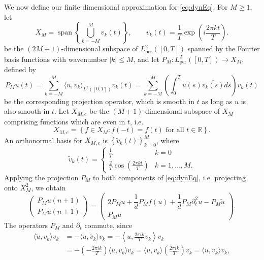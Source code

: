 \documentclass[12pt,reqno]{amsart}
\def\R{{\mathbb R}}
\def\per{\textrm{per}}
\DeclareMathOperator{\spn}{span}
\begin{document}
We now define our finite dimensional approximation for \cref{eq:dynEq}. For $M \geq 1$, let 
\begin{equation}\label{eq:XM}
X_M = \spn\left\{ \bigcup_{k = -M}^M v_k(t) \right\}, \qquad
v_k(t) = \frac{1}{T} \exp\left( i \frac{2 \pi k t}{T} \right).
\end{equation}
be the $(2M+1)$-dimensional subspace of $L_\per^2([0,T])$ spanned by the Fourier basis functions with wavenumber $|k| \leq M$, and let $P_M: L_\per^2([0,T]) \rightarrow X_M$, defined by
\begin{equation}\label{eq:PM}
P_M u(t) = \sum_{k=-M}^M \langle u, v_k \rangle_{L^2([0,T])} v_k(t)
= \sum_{k=-M}^M \left( \int_0^T u(s) \overline{v_k(s)} ds \right) v_k(t)
\end{equation}
be the corresponding projection operator, which is smooth in $t$ as long as $u$ is also smooth in $t$. Let $X_{M,e}$ be the $(M+1)$-dimensional subspace of $X_M$ comprising functions which are even in $t$, i.e.
\begin{equation}
X_{M,e} = \left\{ f \in X_M : f(-t) = f(t) \text{ for all }t \in \R \right\}.
\end{equation}
An orthonormal basis for $X_{M,e}$ is $\left\{ \tilde{v}_k(t) \right\}_{k=0}^M$, where
\begin{equation}\label{eq:vktilde}
\tilde{v}_k(t) = \begin{cases}
\frac{1}{T} & k = 0 \\
\frac{2}{T} \cos\left( \frac{2 \pi k t}{T} \right) & k = 1, \dots, M.
\end{cases}
\end{equation}
Applying the projection $P_M$ to both components of \cref{eq:dynEq}, i.e. projecting onto $X_M^2$, we obtain
\begin{equation}
\begin{pmatrix}P_M u(n+1) \\ P_M \tilde{u}(n+1) \end{pmatrix} = 
\begin{pmatrix}2 P_M u  + \dfrac{1}{d}P_M f(u) + \dfrac{1}{d} P_M \partial_t^2 u - P_M \tilde{u} \\
P_M u
\end{pmatrix}.
\end{equation}
The operators $P_M$ and $\partial_t$ commute, since 
\begin{align*}
\langle \dot{u}, v_k \rangle v_k &= -\langle u, \dot{v}_k \rangle v_k
= -\left\langle u, \frac{2 \pi i k}{T} v_k \right\rangle v_k \\
&= -\left( -\frac{2 \pi i k}{T} \right) \langle u, v_k \rangle v_k
= \langle u, v_k \rangle \left( \frac{2 \pi i k}{T} \right) v_k 
= \langle u, v_k \rangle \dot{v}_k,
\end{align*}
\end{document}
